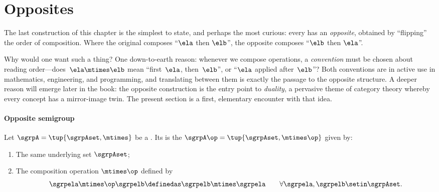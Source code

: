 
\section{Opposites}
\label{sec:opposites-algebra}


The last construction of this chapter is the simplest to state, and perhaps the most curious: every  has an \emph{opposite}, obtained by ``flipping'' the order of composition.
Where the original composes ``$\ela$ then $\elb$'', the opposite composes ``$\elb$ then $\ela$''.

Why would one want such a thing?
One down-to-earth reason: whenever we compose operations, a \emph{convention} must be chosen about reading order---does~$\ela \mtimes \elb$ mean ``first~$\ela$, then~$\elb$'', or ``$\ela$ applied after~$\elb$''?
Both conventions are in active use in mathematics, engineering, and programming, and translating between them is exactly the passage to the opposite structure.
A deeper reason will emerge later in the book: the opposite construction is the entry point to \emph{duality}, a pervasive theme of category theory whereby every concept has a mirror-image twin.
The present section is a first, elementary encounter with that idea.

\paragraph{Opposite semigroup}

\begin{ctdefinition}\label{def:opposite-semigroup}
    Let $\sgrpA = \tup{\sgrpAset, {{\mtimes}}}$ be a .
    Its  is the  $\sgrpA\op = \tup{\sgrpAset, {{\mtimes\op}}}$ given by:

    \constit
    \begin{enumerate}
        \item The same underlying set $\sgrpAset$;
        \item The composition operation $\mtimes\op$ defined by
              \begin{equation}
                  \label{eq:opposite-composition}
                  \sgrpela \mtimes\op \sgrpelb \definedas \sgrpelb \mtimes \sgrpela
                  \qquad \forall \sgrpela, \sgrpelb \setin \sgrpAset.
              \end{equation}
    \end{enumerate}
\end{ctdefinition}

